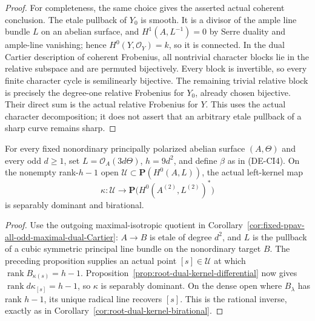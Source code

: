 \begin{proof}
For completeness, the same choice gives the asserted actual
coherent conclusion.  The etale pullback of \(Y_0\) is smooth.
It is a divisor of the ample line bundle \(L\) on an abelian
surface, and \(H^1(A,L^{-1})=0\) by Serre duality and ample-line
vanishing; hence \(H^0(Y,\mathcal O_Y)=k\), so it is connected.
In the dual Cartier description of coherent Frobenius, all
nontrivial character blocks lie in the relative subspace and
are permuted bijectively.  Every block is invertible, so every
finite character cycle is semilinearly bijective.  The remaining
trivial relative block is precisely the degree-one relative
Frobenius for \(Y_0\), already chosen bijective.  Their direct
sum is the actual relative Frobenius for \(Y\).  This uses the
actual character decomposition; it does not assert that an
arbitrary etale pullback of a sharp curve remains sharp.
\end{proof}

\begin{corollary}
\label{cor:DE-odd-principal-cube-kernel-birational}
For every fixed nonordinary principally polarized abelian surface
\((A,\Theta)\) and every odd \(d\ge1\), set
\(L=\mathcal O_A(3d\Theta)\), \(h=9d^2\), and define \(\beta\)
as in (DE-CI4).  On the nonempty rank-\(h-1\) open
\(\mathcal U\subset\mathbf P(H^0(A,L))\), the actual left-kernel map
\[
 \kappa:\mathcal U\longrightarrow
        \mathbf P\bigl(H^0(A^{(2)},L^{(2)})^*\bigr)
\]
is separably dominant and birational.
\end{corollary}
\begin{proof}
Use the outgoing maximal-isotropic quotient in
Corollary~\ref{cor:fixed-ppav-all-odd-maximal-dual-Cartier}:
\(A\to B\) is etale of degree \(d^2\), and
\(L\) is the pullback of a cubic symmetric principal line bundle
on the nonordinary target \(B\).  The preceding proposition
supplies an actual point \([s]\in\mathcal U\) at which
\(\operatorname{rank}B_{\kappa(s)}=h-1\).
Proposition~\ref{prop:root-dual-kernel-differential} now gives
\(\operatorname{rank}d\kappa_{[s]}=h-1\), so \(\kappa\)
is separably dominant.  On the dense open where \(B_\lambda\)
has rank \(h-1\), its unique radical line recovers \([s]\).
This is the rational inverse, exactly as in
Corollary~\ref{cor:root-dual-kernel-birational}.
\end{proof}

